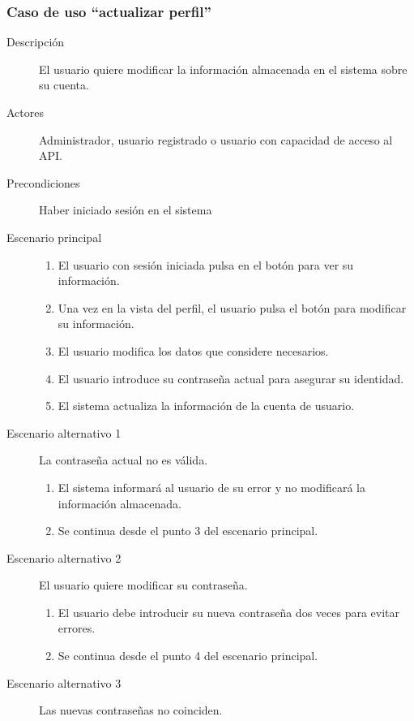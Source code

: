\subsubsection{Caso de uso ``actualizar perfil''}
\begin{description}
\item[Descripción] 			El usuario quiere modificar la información almacenada en el sistema sobre su cuenta.
\item[Actores] 				Administrador, usuario registrado o usuario con capacidad de acceso al API.
\item[Precondiciones]  		Haber iniciado sesión en el sistema
\item[Escenario principal] 	\hfill
						 	\begin{enumerate}
							\item El usuario con sesión iniciada pulsa en el botón para ver su información.
							\item Una vez en la vista del perfil, el usuario pulsa el botón para modificar su información.
							\item El usuario modifica los datos que considere necesarios.
							\item El usuario introduce su contraseña actual para asegurar su identidad.
							\item El sistema actualiza la información de la cuenta de usuario.
							\end{enumerate}
\item[Escenario alternativo 1] La contraseña actual no es válida.
							\begin{enumerate}
							\item El sistema informará al usuario de su error y no modificará la información almacenada.
							\item Se continua desde el punto 3 del escenario principal.
							\end{enumerate}
\item [Escenario alternativo 2] El usuario quiere modificar su contraseña.
							\begin{enumerate}
							\item El usuario debe introducir su nueva contraseña dos veces para evitar errores.
							\item Se continua desde el punto 4 del escenario principal.
							\end{enumerate}							
\item [Escenario alternativo 3] Las nuevas contraseñas no coinciden.
							\begin{enumerate}

\end{enumerate}
\end{description}
